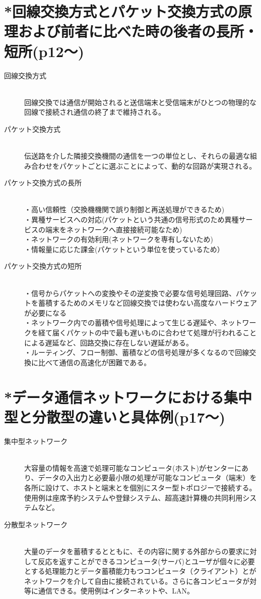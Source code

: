 \documentclass[10.5pt]{jsarticle}
\begin{document}
\section{*回線交換方式とパケット交換方式の原理および前者に比べた時の後者の長所・短所(p12～)}
\begin{description}
 \item[回線交換方式]\mbox{}\\ 
	    回線交換では通信が開始されると送信端末と受信端末がひとつの物理的な回線で接続され通信の終了まで維持される。
 \item[パケット交換方式]\mbox{}\\
	    伝送路を介した隣接交換機間の通信を一つの単位とし、それらの最適な組み合わせをパケットごとに選ぶことによって、動的な回路が実現される。
 \item[パケット交換方式の長所]\mbox{}\\
・高い信頼性（交換機機関で誤り制御と再送処理ができるため)\\・異種サービスへの対応(パケットという共通の信号形式のため異種サービスの端末をネットワークへ直接接続可能なため)\\・ネットワークの有効利用(ネットワークを専有しないため)\\・情報量に応じた課金(パケットという単位を使っているため）
\item[パケット交換方式の短所]\mbox{}\\
・信号からパケットへの変換やその逆変換で必要な信号処理回路、パケットを蓄積するためのメモリなど回線交換では使わない高度なハードウェアが必要になる\\・ネットワーク内での蓄積や信号処理によって生じる遅延や、ネットワークを経て届くパケットの中で最も遅いものに合わせて処理が行われることによる遅延など、回路交換に存在しない遅延がある。\\・ルーティング、フロー制御、蓄積などの信号処理が多くなるので回線交換に比べて通信の高速化が困難である。
\end{description}

\section{*データ通信ネットワークにおける集中型と分散型の違いと具体例(p17～)}
\begin{description}
 \item[集中型ネットワーク]\mbox{}\\ 
	    大容量の情報を高速で処理可能なコンピュータ(ホスト)がセンターにあり、データの入出力と必要最小限の処理が可能なコンピュータ（端末）を各所に設けて、ホストと端末とを個別にスター型トポロジーで接続する。使用例は座席予約システムや登録システム、超高速計算機の共同利用システムなど。
 \item[分散型ネットワーク]\mbox{}\\
	    大量のデータを蓄積するとともに、その内容に関する外部からの要求に対して反応を返すことができるコンピュータ(サーバ)とユーザが個々に必要とする処理能力とデータ蓄積能力もつコンピュータ（クライアント）とがネットワークを介して自由に接続されている。さらに各コンピュータが対等に通信できる。使用例はインターネットや、LAN。
\end{description}
\end{document}
